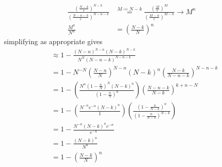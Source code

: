 \documentclass{article}
\theoremstyle{definition}
\begin{document}
\begin{align}
    \frac{\left(\frac{N-k}{e}\right)^{N-k}}{\left(\frac{N-n-k}{e}\right)^{N-n-k}}&\stackrel{M\coloneqq N-k}{=}\frac{\left(\frac{M}{e}\right)^{M}}{\left(\frac{M-n}{e}\right)^{M-n}}\to M^{n}\\
    \frac{M^{n}}{N^{n}}&=\left(\frac{N-k}{N}\right)^{n}
\end{align}
simplifying as appropriate gives
\begin{align}
    & \approx 1- \frac{\left(N-n\right)^{N-n}\left(N-k\right)^{N-k}}{N^{N}\left(N-n-k\right)^{N-n-k}}\\
    &= 1- N^{-N}\left(\frac{N-n}{N}\right)^{N-n}\left(N-k\right)^{n}\left(\frac{N-k}{N-n-k}\right)^{N-n-k}\\
    &=1-\left(\frac{N^{n}\left(1-\frac{n}{N}\right)^{N}\left(N-k\right)^{n}}{\left(1-\frac{n}{N}\right)^{n}}\right)\left(\frac{N-n-k}{N-k}\right)^{k+n-N}\\
    &=1-\left(\frac{N^{-n}e^{-n}\left(N-k\right)^{n}}{1}\right)\left(\frac{\left(1-\frac{n}{N-k}\right)^{n}}{\left(1-\frac{n}{N-k}\right)^{N-k}}\right)\\
    &=1-\frac{N^{-n}\left(N-k\right)^{n}e^{-n}}{e^{-n}}\\
    &=1-\frac{\left(N-k\right)^{n}}{N^{n}}\\
    &=1-\left(\frac{N-k}{N}\right)^{n}
\end{align}
\end{document}
